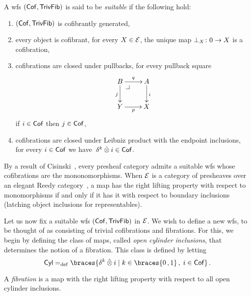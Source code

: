 \documentclass[reqno,10pt,a4paper,oneside,draft]{amsart}
\begin{document}
\begin{definition} \label{thm:suitable-wfs}
A wfs $(\Cof, \TrivFib)$ is said to be \emph{suitable} if the following hold:
\begin{enumerate}[({S}1)]
\item $(\Cof, \TrivFib)$ is cofibrantly generated,
\item every object is cofibrant, \ie for every $X \in \cal{E}$, the unique map $\bot_X \co 0 \to X$ is a cofibration,
\item cofibrations are closed under pullbacks, \ie for every pullback square
\[
\xymatrix{
  B
  \ar[d]_j
  \ar[r]^q
  \pullback{dr}
&
  A
  \ar[d]^i
\\
  Y
  \ar[r]_p
&
  X
}
\]
if $i \in \Cof$ then $j \in \Cof$,
\item cofibrations are closed under Leibniz product with the endpoint inclusions, \ie for every $i \in \Cof$ we have~$\kcyl \hatotimes i \in \Cof$.
\end{enumerate}
\end{definition}

\begin{example} \label{thm:generation-presheaf-cisinski}
By a result of Cisinski~\cite[Proposition~1.2.27]{cisinski-asterisque}, every presheaf category admits a suitable wfs whose cofibrations are the mononomorphisms.
When $\cal{E}$ is a category of presheaves over an elegant Reedy category~\cite{bergner-rezk-elegant}, a map has the right lifting property with respect to monomorphisms if and only if it has it with respect to boundary inclusions (latching object inclusions for representables).
\end{example}

Let us now fix a suitable wfs $(\Cof,\TrivFib)$ in $\catE$.
We wish to define a new wfs, to be thought of as consisting of trivial cofibrations and fibrations.
For this, we begin by defining the class of maps, called \emph{open cylinder inclusions}, that determines the notion of a fibration.
This class is defined by letting
\begin{equation} \label{equ:cylinc}
\Cyl \defeq \braces{\kcyl \hatotimes i \mid k \in \braces{0\,, 1} \, , \; i \in \Cof}
\, .\end{equation}

\begin{definition} \label{thm:fib}
A \emph{fibration} is a map with the right lifting property with respect to all open cylinder inclusions.
\end{definition}
\end{document}
